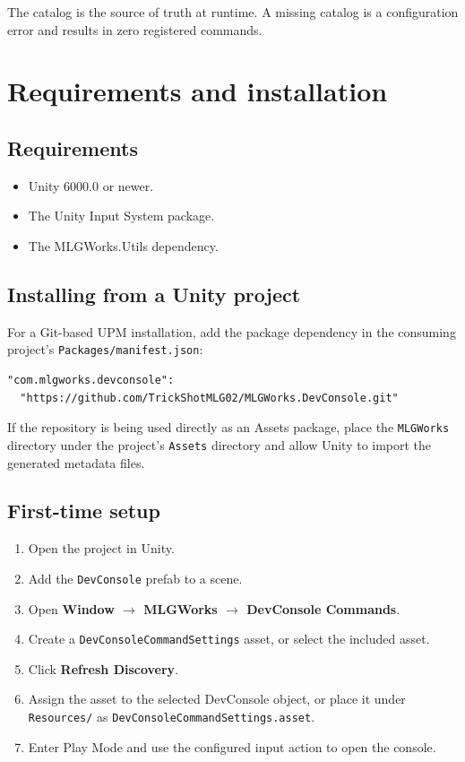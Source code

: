 \documentclass[11pt,a4paper]{article}
\begin{document}
\begin{important}
The catalog is the source of truth at runtime. A missing catalog is a configuration error and results in zero registered commands.
\end{important}

\section{Requirements and installation}

\subsection{Requirements}

\begin{itemize}[leftmargin=*]
  \item Unity 6000.0 or newer.
  \item The Unity Input System package.
  \item The MLGWorks.Utils dependency.
\end{itemize}

\subsection{Installing from a Unity project}

For a Git-based UPM installation, add the package dependency in the consuming project's \texttt{Packages/manifest.json}:

\begin{lstlisting}[style=csharp]
"com.mlgworks.devconsole":
  "https://github.com/TrickShotMLG02/MLGWorks.DevConsole.git"
\end{lstlisting}

If the repository is being used directly as an Assets package, place the \texttt{MLGWorks} directory under the project's \texttt{Assets} directory and allow Unity to import the generated metadata files.

\subsection{First-time setup}

\begin{enumerate}[leftmargin=*]
  \item Open the project in Unity.
  \item Add the \texttt{DevConsole} prefab to a scene.
  \item Open \textbf{Window $\rightarrow$ MLGWorks $\rightarrow$ DevConsole Commands}.
  \item Create a \texttt{DevConsoleCommandSettings} asset, or select the included asset.
  \item Click \textbf{Refresh Discovery}.
  \item Assign the asset to the selected DevConsole object, or place it under \texttt{Resources/} as \texttt{DevConsoleCommandSettings.asset}.
  \item Enter Play Mode and use the configured input action to open the console.
\end{enumerate}
\end{document}
